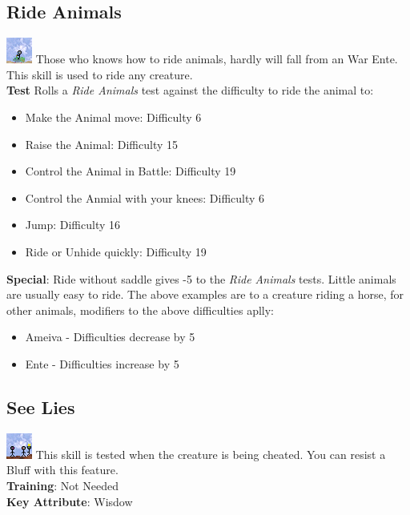 \documentclass[ letterpaper,12pt]{article}
\begin{document}
\subsection{Ride Animals}
\includegraphics{../data/skills/Img/montar.png}
Those who knows how to ride animals, hardly will fall from an War Ente. This  skill is used to ride any creature.\\
{\bf Test}
Rolls a {\it Ride Animals} test against the difficulty to ride the animal to:\\
\begin{itemize}
\item{Make the Animal move: Difficulty 6}
\item{Raise the Animal: Difficulty 15}
\item{Control the Animal in Battle: Difficulty 19}
\item{Control the Anmial with your knees: Difficulty 6}
\item{Jump: Difficulty 16}
\item{Ride or Unhide quickly: Difficulty 19}
\end{itemize}
{\bf Special}: Ride without saddle gives -5 to the {\it Ride Animals} tests. Little animals are usually easy to ride. The above examples are to a creature riding a horse, for other animals, modifiers to the above difficulties aplly:\\
\begin{itemize}
\item{Ameiva - Difficulties decrease by 5}
\item{Ente - Difficulties increase by 5}
\end{itemize}

\subsection{See Lies}
\includegraphics{../data/skills/Img/desmentir.png}
This skill is tested when the creature is being cheated. You can resist a Bluff with this feature.\\
{\bf Training}: Not Needed\\
{\bf Key Attribute}: Wisdow\\
\end{document}
